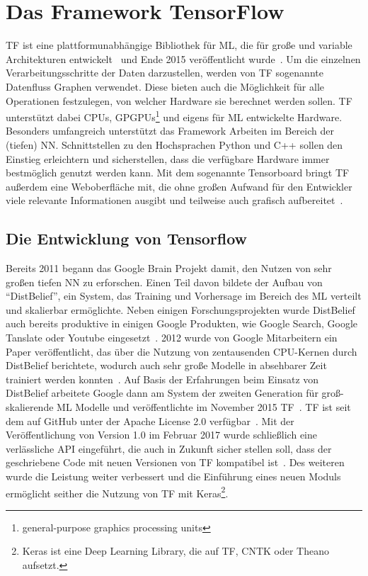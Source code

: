 \chapter{Das Framework TensorFlow}

\gls{TF} ist eine plattformunabhängige Bibliothek für \gls{ML}, die für große und variable Architekturen entwickelt~\cite{tensorflow2015-whitepaper} und Ende 2015 veröffentlicht wurde~\cite{tf-opensource}. Um die einzelnen Verarbeitungsschritte der Daten darzustellen, werden von \gls{TF} sogenannte Datenfluss Graphen verwendet. Diese bieten auch die Möglichkeit für alle Operationen festzulegen, von welcher Hardware sie berechnet werden sollen. \gls{TF} unterstützt dabei CPUs, GPGPUs\footnote{general-purpose graphics processing units} und eigens für \gls{ML} entwickelte Hardware.
Besonders umfangreich unterstützt das Framework Arbeiten im Bereich der (tiefen) \gls{NN}. Schnittstellen zu den Hochsprachen Python und C++ sollen den Einstieg erleichtern und sicherstellen, dass die verfügbare Hardware immer bestmöglich genutzt werden kann. Mit dem sogenannte Tensorboard bringt \gls{TF} außerdem eine Weboberfläche mit, die ohne großen Aufwand für den Entwickler viele relevante Informationen ausgibt und teilweise auch grafisch aufbereitet~\cite{tensorflow2016-whitepaper}.

\section{Die Entwicklung von Tensorflow}
Bereits 2011 begann das Google Brain Projekt damit, den Nutzen von sehr großen tiefen \gls{NN} zu erforschen. Einen Teil davon bildete der Aufbau von "`DistBelief"', ein System, das Training und Vorhersage im Bereich des \gls{ML} verteilt und skalierbar ermöglichte. Neben einigen Forschungsprojekten wurde DistBelief auch bereits produktive in einigen Google Produkten, wie Google Search, Google Tanslate oder Youtube eingesetzt~\cite{tensorflow2016-whitepaper}. 2012 wurde von Google Mitarbeitern ein Paper veröffentlicht, das über die Nutzung von zentausenden CPU-Kernen  durch DistBelief berichtete, wodurch auch sehr große Modelle in absehbarer Zeit trainiert werden konnten~\cite{NIPS2012}. Auf Basis der Erfahrungen beim Einsatz von DistBelief arbeitete Google dann am System der zweiten Generation für groß-skalierende \gls{ML} Modelle und veröffentlichte im November 2015 \gls{TF}~\cite{tf-opensource}. \gls{TF} ist seit dem auf GitHub unter der Apache License 2.0 verfügbar~\cite{tf-git}.  Mit der Veröffentlichung von Version 1.0 im Februar 2017 wurde schließlich eine verlässliche API eingeführt, die auch in Zukunft sicher stellen soll, dass der geschriebene Code mit neuen Versionen von \gls{TF} kompatibel ist~\cite{tf1}. Des weiteren wurde die Leistung weiter verbessert und die Einführung eines neuen Moduls ermöglicht seither die Nutzung von \gls{TF} mit Keras\footnote{Keras ist eine Deep Learning Library, die auf \gls{TF}, CNTK oder Theano aufsetzt.}.

